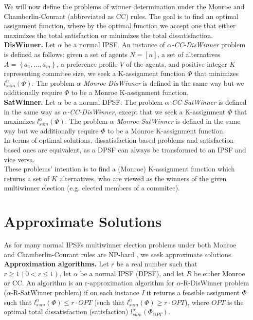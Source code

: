 We will now define the problems of winner determination under the Monroe and Chamberlin-Courant (abbreviated as CC) rules. The goal is to find an optimal assignment function, where by the optimal function we accept one that either maximizes the total satisfaction or minimizes the total dissatisfaction.
\\

\noindent
\textbf{DisWinner.} Let $\alpha$ be a normal IPSF. An instance of $\alpha$\textit{-CC-DisWinner} problem is defined as follows: given a set of agents $N = [n]$, a set of alternatives $A = \left\{ a_{1}, \ldots, a_{m} \right\}$, a preference profile $V$ of the agents, and positive integer $K$ representing commitee size, we seek a K-assignment function $\Phi$ that minimizes $l^{\alpha}_{sum}(\Phi)$. The problem $\alpha$\textit{-Monroe-DisWinner} is defined in the same way but we additionally require $\Phi$ to be a Monroe K-assignment function.
\\

\noindent
\textbf{SatWinner.} Let $\alpha$ be a normal DPSF. The problem $\alpha$\textit{-CC-SatWinner} is defined in the same way as $\alpha$\textit{-CC-DisWinner}, except that we seek a K-assignment $\Phi$ that maximizes $l^{\alpha}_{sum}(\Phi)$. The problem $\alpha$\textit{-Monroe-SatWinner} is defined in the same way but we additionally require $\Phi$ to be a Monroe K-assignment function.
\\

In terms of optimal solutions, dissatisfaction-based problems and satisfaction-based ones are equivalent, as a DPSF can always be transformed to an IPSF and vice versa.
\\

These problems' intention is to find a (Monroe) K-assignment function which returns a set of $K$ alternatives, who are viewed as the winners of the given multiwinner election (e.g. elected members of a commitee).

\section{Approximate Solutions}

As for many normal IPSFs multiwinner election problems under both Monroe and Chamberlin-Courant rules are NP-hard \cite{2,3}, we seek approximate solutions.
\\

\noindent
\textbf{Approximation algorithms.} Let $r$ be a real number such that $r \geq 1 (0 < r \leq 1)$, let $\alpha$ be a normal IPSF (DPSF), and let $R$ be either Monroe or CC. An algorithm is an r-approximation algorithm for $\alpha$-R-DisWinner problem ($\alpha$-R-SatWinner problem) if on each instance $I$ it returns a feasible assignment $\Phi$ such that $l^{\alpha}_{sum}(\Phi) \leq r \cdot OPT$ (such that $l^{\alpha}_{sum}(\Phi) \geq r \cdot OPT$), where $OPT$ is the optimal total dissatisfaction (satisfaction) $l^{\alpha}_{sum}(\Phi_{OPT})$.
\\
